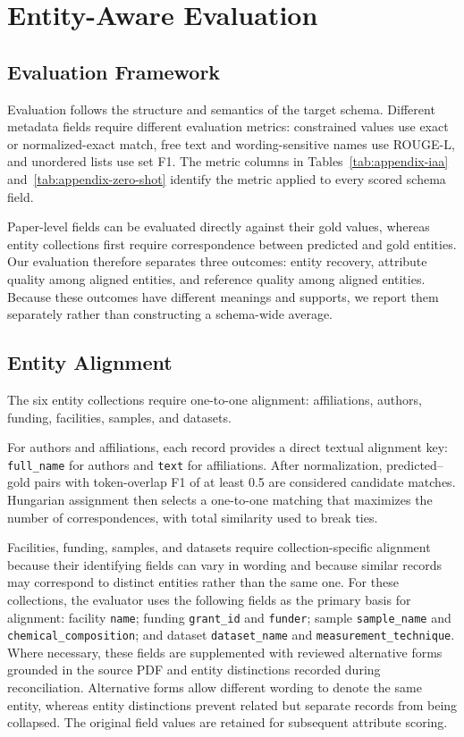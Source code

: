 \section{Entity-Aware Evaluation}
\label{sec:evaluation}

\subsection{Evaluation Framework}
\label{sec:evaluation-framework}

Evaluation follows the structure and semantics of the target schema. Different
metadata fields require different evaluation metrics: constrained values use
exact or normalized-exact match, free text and wording-sensitive names use
ROUGE-L, and unordered lists use set F1. The metric columns in
Tables~\ref{tab:appendix-iaa} and~\ref{tab:appendix-zero-shot} identify the
metric applied to every scored schema field.

Paper-level fields can be evaluated directly against their gold values,
whereas entity collections first require correspondence between
predicted and gold entities. Our evaluation therefore separates three
outcomes: entity recovery, attribute quality among aligned entities, and
reference quality among aligned entities. Because these outcomes
have different meanings and supports, we report them separately rather than
constructing a schema-wide average.


\subsection{Entity Alignment}
\label{sec:entity-alignment}

The six entity collections require one-to-one alignment:
affiliations, authors, funding, facilities, samples, and datasets.

For authors and affiliations, each record provides a direct textual alignment
key: \texttt{full\_name} for authors and \texttt{text} for affiliations.
After normalization, predicted--gold pairs with token-overlap F1 of at least
0.5 are considered candidate matches. Hungarian assignment then selects a
one-to-one matching that maximizes the number of correspondences, with total
similarity used to break ties.

Facilities, funding, samples, and datasets require collection-specific
alignment because their identifying fields can vary in wording and because
similar records may correspond to distinct entities rather than the same one.
For these collections, the evaluator uses the following fields as the primary
basis for alignment: facility \texttt{name}; funding \texttt{grant\_id} and
\texttt{funder}; sample \texttt{sample\_name} and
\texttt{chemical\_composition}; and dataset \texttt{dataset\_name} and
\texttt{measurement\_technique}. Where necessary, these fields are
supplemented with reviewed alternative forms grounded in the source PDF and
entity distinctions recorded during reconciliation. Alternative forms allow
different wording to denote the same entity, whereas entity distinctions
prevent related but separate records from being collapsed. The original field
values are retained for subsequent attribute scoring.

